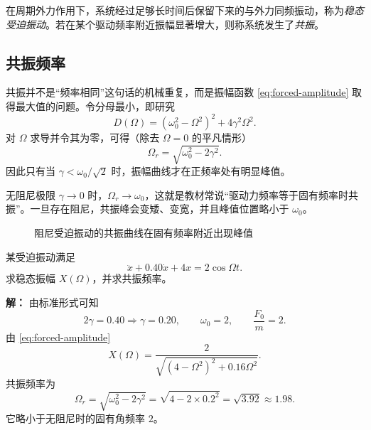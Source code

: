 \begin{definition}
在周期外力作用下，系统经过足够长时间后保留下来的与外力同频振动，称为\emph{稳态受迫振动}。若在某个驱动频率附近振幅显著增大，则称系统发生了\emph{共振}。
\end{definition}

\subsection{共振频率}

共振并不是“频率相同”这句话的机械重复，而是振幅函数 \eqref{eq:forced-amplitude} 取得最大值的问题。令分母最小，即研究
\[
D(\Omega)=(\omega_0^2-\Omega^2)^2+4\gamma^2\Omega^2.
\]
对 $\Omega$ 求导并令其为零，可得（除去 $\Omega=0$ 的平凡情形）
\[
\Omega_r=\sqrt{\omega_0^2-2\gamma^2}.
\]
因此只有当 $\gamma<\omega_0/\sqrt2$ 时，振幅曲线才在正频率处有明显峰值。

\begin{remark}
无阻尼极限 $\gamma\to 0$ 时，$\Omega_r\to\omega_0$，这就是教材常说“驱动力频率等于固有频率时共振”。一旦存在阻尼，共振峰会变矮、变宽，并且峰值位置略小于 $\omega_0$。
\end{remark}

\begin{figure}[htbp]
\centering
{}
\caption{阻尼受迫振动的共振曲线在固有频率附近出现峰值}
\end{figure}

\begin{example}
某受迫振动满足
\[
\ddot x+0.40\dot x+4x=2\cos\Omega t.
\]
求稳态振幅 $X(\Omega)$，并求共振频率。

\textbf{解：} 由标准形式可知
\[
2\gamma=0.40\Rightarrow \gamma=0.20,
\qquad
\omega_0=2,
\qquad
\frac{F_0}{m}=2.
\]
由 \eqref{eq:forced-amplitude}
\[
X(\Omega)=\frac{2}{\sqrt{(4-\Omega^2)^2+0.16\Omega^2}}.
\]
共振频率为
\[
\Omega_r=\sqrt{\omega_0^2-2\gamma^2}
=\sqrt{4-2\times 0.2^2}
=\sqrt{3.92}
\approx 1.98.
\]
它略小于无阻尼时的固有角频率 $2$。
\end{example}

